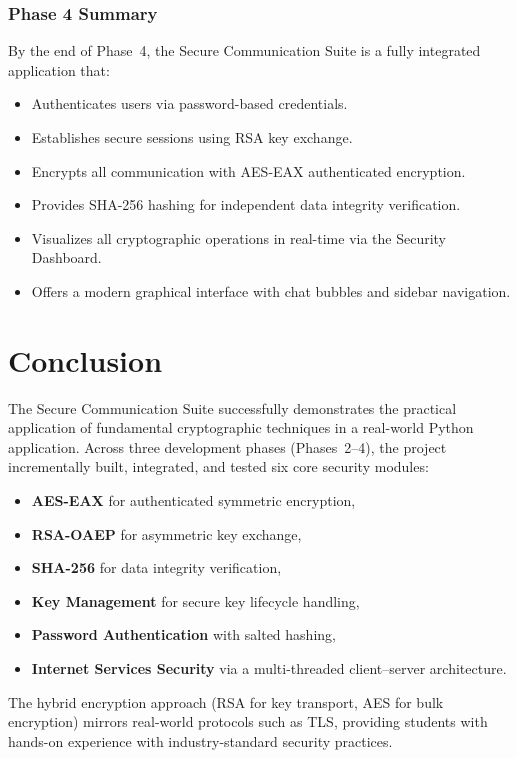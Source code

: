 \documentclass[12pt,a4paper]{article}
\begin{document}
\subsubsection{Phase 4 Summary}
By the end of Phase~4, the Secure Communication Suite is a fully integrated application that:
\begin{itemize}
    \item Authenticates users via password-based credentials.
    \item Establishes secure sessions using RSA key exchange.
    \item Encrypts all communication with AES-EAX authenticated encryption.
    \item Provides SHA-256 hashing for independent data integrity verification.
    \item Visualizes all cryptographic operations in real-time via the Security Dashboard.
    \item Offers a modern graphical interface with chat bubbles and sidebar navigation.
\end{itemize}

\newpage
\section{Conclusion}

The Secure Communication Suite successfully demonstrates the practical application of fundamental cryptographic techniques in a real-world Python application. Across three development phases (Phases~2--4), the project incrementally built, integrated, and tested six core security modules:

\begin{itemize}
    \item \textbf{AES-EAX} for authenticated symmetric encryption,
    \item \textbf{RSA-OAEP} for asymmetric key exchange,
    \item \textbf{SHA-256} for data integrity verification,
    \item \textbf{Key Management} for secure key lifecycle handling,
    \item \textbf{Password Authentication} with salted hashing,
    \item \textbf{Internet Services Security} via a multi-threaded client--server architecture.
\end{itemize}

The hybrid encryption approach (RSA for key transport, AES for bulk encryption) mirrors real-world protocols such as TLS, providing students with hands-on experience with industry-standard security practices.
\end{document}
